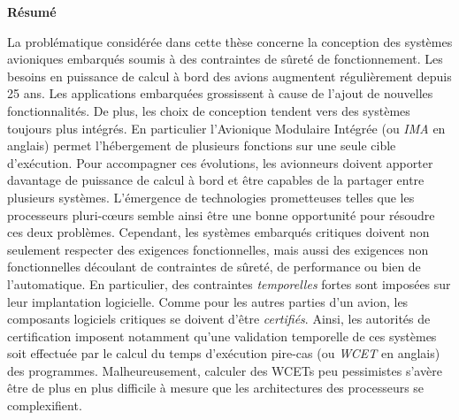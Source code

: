 \documentclass[main.tex]{subfiles}
\begin{document}
\begin{center} \LARGE \bf
Résumé
\vspace{5mm} \end{center}
La problématique considérée dans cette thèse concerne la conception des systèmes
avioniques embarqués soumis à des contraintes de sûreté de fonctionnement.  Les
besoins en puissance de calcul à bord des avions augmentent régulièrement depuis
25 ans.  Les applications embarquées grossissent à cause de l'ajout de nouvelles
fonctionnalités.  De plus, les choix de conception tendent vers des systèmes
toujours plus intégrés.  En particulier l'Avionique Modulaire Intégrée (ou
\emph{IMA} en anglais) permet l'hébergement de plusieurs fonctions sur une seule
cible d'exécution.  Pour accompagner ces évolutions, les avionneurs doivent
apporter davantage de puissance de calcul à bord et être capables de la partager
entre plusieurs systèmes.  L'émergence de technologies prometteuses telles que
les processeurs pluri-c\oe{}urs semble ainsi être une bonne opportunité pour
résoudre ces deux problèmes.  Cependant, les systèmes embarqués critiques
doivent non seulement respecter des exigences fonctionnelles, mais aussi des
exigences non fonctionnelles découlant de contraintes de sûreté, de performance
ou bien de l'automatique.  En particulier, des contraintes \emph{temporelles}
fortes sont imposées sur leur implantation logicielle.  Comme pour les autres
parties d'un avion, les composants logiciels critiques se doivent d'être
\emph{certifiés}. Ainsi, les autorités de certification imposent notamment
qu'une validation temporelle de ces systèmes soit effectuée par le calcul du
temps d'exécution pire-cas (ou \emph{WCET} en anglais) des programmes.
Malheureusement, calculer des WCETs peu pessimistes s'avère être de plus en plus
difficile à mesure que les architectures des processeurs se complexifient. \\
\end{document}
